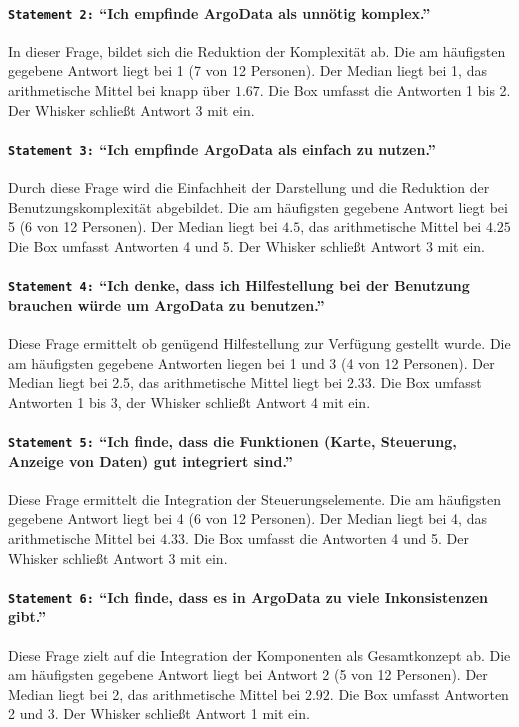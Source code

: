  \paragraph{\texttt{Statement 2:} "`Ich empfinde ArgoData als unnötig komplex."'}
    In dieser Frage, bildet sich die Reduktion der Komplexität ab.
    Die am häufigsten gegebene Antwort liegt bei 1 (7 von 12 Personen).  Der Median liegt bei 1, das arithmetische Mittel bei knapp über $1.67$. Die Box umfasst die Antworten 1 bis 2. Der Whisker schließt Antwort 3 mit ein.

  \paragraph{\texttt{Statement 3:} "`Ich empfinde ArgoData als einfach zu nutzen."'}
    Durch diese Frage wird die Einfachheit der Darstellung und die Reduktion der Benutzungskomplexität abgebildet. Die am häufigsten gegebene Antwort liegt bei 5 (6 von 12 Personen). Der Median liegt bei $4.5$, das arithmetische Mittel bei $4.25$   Die Box umfasst Antworten 4 und 5. Der Whisker schließt Antwort 3 mit ein.

\paragraph{\texttt{Statement 4:} "`Ich denke, dass ich Hilfestellung bei der Benutzung brauchen würde um ArgoData zu benutzen."'}
    Diese Frage ermittelt ob genügend Hilfestellung zur Verfügung gestellt wurde.  Die am häufigsten gegebene Antworten liegen bei 1 und 3 (4 von 12 Personen).  Der Median liegt bei 2.5, das arithmetische Mittel liegt bei $2.33$. Die Box umfasst Antworten 1 bis 3, der Whisker schließt Antwort 4 mit ein.

\paragraph{\texttt{Statement 5:} "`Ich finde, dass die Funktionen (Karte, Steuerung, Anzeige von Daten) gut integriert sind."'}
    Diese Frage ermittelt die Integration der Steuerungselemente. 
    Die am häufigsten gegebene Antwort liegt bei 4 (6 von 12 Personen). Der Median liegt bei 4, das arithmetische Mittel bei $4.33$. Die Box umfasst  die Antworten 4 und 5. Der Whisker schließt Antwort 3 mit ein.

\paragraph{\texttt{Statement 6:} "`Ich finde, dass es in ArgoData zu viele Inkonsistenzen gibt."'}
    Diese Frage zielt auf die Integration der Komponenten als Gesamtkonzept ab. Die am häufigsten gegebene Antwort liegt bei Antwort 2 (5 von 12 Personen). Der Median liegt bei 2, das arithmetische Mittel bei $2.92$. Die Box umfasst Antworten 2 und 3. Der Whisker schließt Antwort 1 mit ein.

